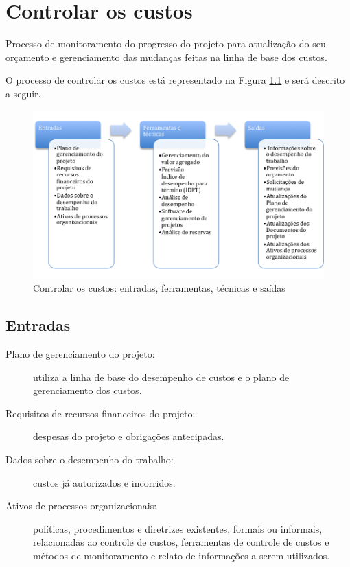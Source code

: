 \chapter{Controlar os custos}

Processo de monitoramento do progresso do projeto para atualização do seu orçamento e gerenciamento das mudanças feitas na linha de base dos custos.

O processo de controlar os custos está representado na Figura \ref{fig:custos:controlar:efts} e será descrito a seguir.

\begin{figure}[!h]
	\centering
	\includegraphics[scale=0.5]{Figuras/custos_efts_controlar.png}
	\caption{Controlar os custos: entradas, ferramentas, técnicas e saídas}
	\label{fig:custos:controlar:efts}
\end{figure}

\section{Entradas}

\begin{description}
	
	\item[Plano de gerenciamento do projeto:] utiliza a linha de base do desempenho de custos e o plano de gerenciamento dos custos.
	
	\item[Requisitos de recursos financeiros do projeto:] despesas do projeto e obrigações antecipadas.
	
	\item[Dados sobre o desempenho do trabalho:] custos já autorizados e incorridos.
	
	\item[Ativos de processos organizacionais:] políticas, procedimentos e diretrizes existentes, formais ou informais, relacionadas ao controle de custos, ferramentas de controle de custos e métodos de monitoramento e relato de informações a serem utilizados.
	
\end{description}

